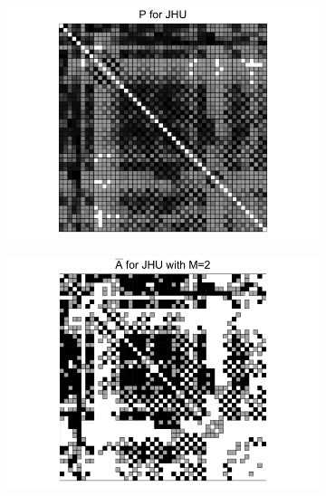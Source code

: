 \documentclass[a4paper]{article}
\begin{document}
\begin{figure}
\centering
\begin{subfigure}{.33\textwidth}
  \centering
  \includegraphics[width=1.2\linewidth]{P_JHU.png}
\end{subfigure}%
\begin{subfigure}{.33\textwidth}
  \centering
  \includegraphics[width=1.2\linewidth]{Abar_JHU_m2.png}
\end{subfigure}
\begin{subfigure}{.33\textwidth}
  \centering

\end{subfigure}
\end{figure}
\end{document}
